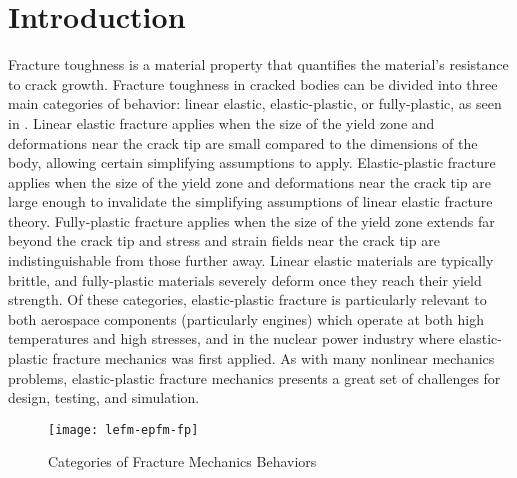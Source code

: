 \chapter{Introduction} \label{chap:intro}
Fracture toughness is a material property that quantifies the material's resistance to crack growth.
Fracture toughness in cracked bodies can be divided into three main categories of behavior: linear elastic, elastic-plastic, or fully-plastic, as seen in .
Linear elastic fracture applies when the size of the yield zone and deformations near the crack tip are small compared to the dimensions of the body, allowing certain simplifying assumptions to apply.
Elastic-plastic fracture applies when the size of the yield zone and deformations near the crack tip are large enough to invalidate the simplifying assumptions of linear elastic fracture theory.
Fully-plastic fracture applies when the size of the yield zone extends far beyond the crack tip and stress and strain fields near the crack tip are indistinguishable from those further away.
Linear elastic materials are typically brittle, and fully-plastic materials severely deform once they reach their yield strength.
Of these categories, elastic-plastic fracture is particularly relevant to both aerospace components (particularly engines)
which operate at both high temperatures and high stresses, and in the nuclear power industry where elastic-plastic fracture mechanics was first applied.
As with many nonlinear mechanics problems, elastic-plastic fracture mechanics presents a great set of challenges for design, testing, and simulation.
\begin{figure}[tbp]
\centering
\texttt{[image: lefm-epfm-fp]}
\caption[Categories of Fracture Mechanics Behaviors]{\label{fig:lefm-epfm-fp} Categories of Fracture Mechanics Behaviors \cite{janssenzuidemawanhill2002}}
\end{figure}

